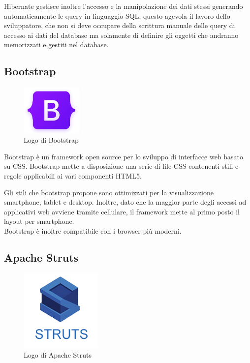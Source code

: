 \setlength{\parskip}{3ex}

\noindent Hibernate gestisce inoltre l'accesso e la manipolazione dei dati stessi generando automaticamente le query in linguaggio SQL; questo agevola il lavoro dello sviluppatore, che non si deve occupare della scrittura manuale delle query di accesso ai dati del database ma solamente di definire gli oggetti che andranno memorizzati e gestiti nel database.

\subsection{Bootstrap}

\begin{figure}[!h]
	\centering
	\includegraphics[width=3cm]{../images/Bootstrap-logo.png}
	\caption{Logo di Bootstrap}
\end{figure}

\noindent Bootstrap è un framework open source per lo sviluppo di interfacce web basato su CSS. Bootstrap mette a disposizione una serie di file CSS contenenti stili e regole applicabili ai vari componenti HTML5.

\setlength{\parskip}{3ex}

\noindent Gli stili che bootstrap propone sono ottimizzati per la visualizzazione smartphone, tablet e desktop. Inoltre, dato che la maggior parte degli accessi ad applicativi web avviene tramite cellulare, il framework mette al primo posto il layout per smartphone.\\
Bootstrap è inoltre compatibile con i browser più moderni.

\pagebreak

\subsection{Apache Struts}

\begin{figure}[!h]
	\centering
	\includegraphics[width=4cm]{../images/Struts-logo.png}
	\caption{Logo di Apache Struts}
\end{figure}

